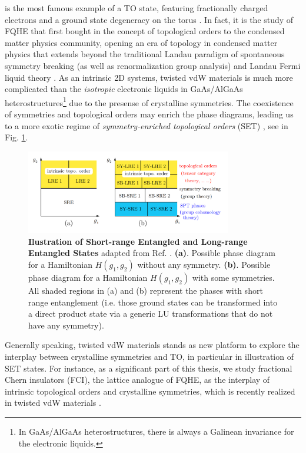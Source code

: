 is the most famous example of a TO state, featuring fractionally charged electrons and a ground state degeneracy on the torus \cite{wen1990ground,wen1989vacuum}. In fact, it is the study of FQHE that first bought in the concept of topological orders to the condensed matter physics community, opening an era of topology in condensed matter physics that extends beyond the traditional Landau paradigm of spontaneous symmetry breaking \cite{anderson1963plasmons} (as well as renormalization group analysis) and Landau Fermi liquid theory \cite{landau1959theory}. As an intrinsic 2D systems, twisted vdW materials is much more complicated than the \emph{isotropic} electronic liquids in GaAs/AlGaAs heterostructures\footnote{In GaAs/AlGaAs heterostructures, there is always a Galinean invariance for the electronic liquids.} due to the presense of crystalline symmetries. The coexistence of symmetries and topological orders may enrich the phase diagrams, leading us to a more exotic regime of \emph{symmetry-enriched topological orders} (SET) \cite{mesaros2013classification,chen2010local}, see in Fig. \ref{fig:SPT_SET_phase_diagram}.
\begin{figure}[!htp]
    \centering
    \includegraphics[width=0.8\textwidth]{figures/SPT_SET_phase_diagram.png}
    \caption{\textbf{Ilustration of Short-range Entangled and Long-range Entangled States} adapted from Ref. \cite{zeng2015quantum}. \textbf{(a)}. Possible phase diagram for a Hamiltonian $H(g_1,g_2)$ without any symmetry. \textbf{(b)}. Possible phase diagram for a Hamiltonian $H(g_1,g_2)$ with some symmetries. All shaded regions in (a) and (b) represent the phases with short range entanglement (i.e. those ground states can be
        transformed into a direct product state via a generic LU transformations that do not have any symmetry).}
    \label{fig:SPT_SET_phase_diagram}
\end{figure}

Generally speaking, twisted vdW materials stands as new platform to explore the interplay between crystalline symmetries and TO, in particular in illustration of SET states. For instance, as a significant part of this thesis, we study fractional Chern insulators (FCI), the lattice analogue of FQHE, as the interplay of intrinsic topological orders and crystalline symmetries, which is recently realized in twisted vdW materials \cite{cai2023signatures,park2023observation,lu2024fractional,zeng2023thermodynamic,xu2023observation}.


